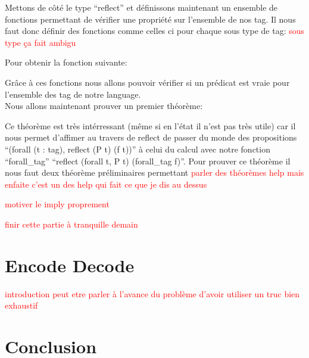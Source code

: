 \documentclass {article}
\newcommand{\codefrom}[3]
           {}
\theoremstyle{definition}
\theoremstyle{remark}
\newcommand{\todo}[1]{\textcolor{red}{#1}}
\begin{document}
\codefrom{rapport}{definitions}{reflect_iff}


Mettons de côté le type ``reflect'' et définissons maintenant un ensemble de
fonctions permettant de vérifier une propriété sur l'ensemble de nos tag.
Il nous faut donc définir des fonctions comme celles ci pour chaque sous type de tag: \todo{sous type ça fait ambigu}

\codefrom{src}{association_list}{forall_tag_uno}

Pour obtenir la fonction suivante:

\codefrom{src}{association_list}{forall_tag}

Grâce à ces fonctions nous allons pouvoir vérifier si un prédicat est vraie pour l'ensemble des tag
de notre language. \\

Nous allons maintenant prouver un premier théorème:
\codefrom{src}{association_list}{forall_tagP}

Ce théorème est très intérressant (même si en l'état il n'est pas très utile) car il nous permet
d'affimer au travers de reflect de passer du monde des propositions ``(forall (t : tag), reflect (P t) (f t))''
à celui du calcul avec notre fonction ``forall\_tag'' ``reflect (forall t, P t) (forall\_tag f)''.
Pour prouver ce théorème il nous faut deux théorème préliminaires permettant
\todo{parler des théorèmes help mais enfaite c'est un des help qui fait ce que je dis au dessus}


\todo{motiver le imply proprement}

\codefrom{src}{association_list}{implyP}

\todo{finir cette partie à tranquille demain}



\section{Encode Decode}

\todo{introduction peut etre parler à l'avance du problème d'avoir utiliser un truc bien exhaustif}
\subsection{}

\section{Conclusion}
\end{document}
